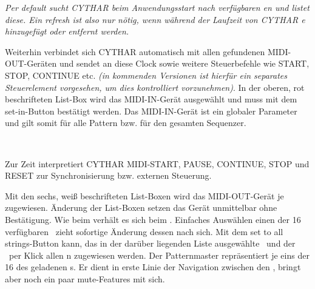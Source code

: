 \documentclass[10pt,final,a4paper]{report}
\begin{document}
\textit{Per default sucht CYTHAR beim Anwendungsstart nach verfügbaren \LEXmididevice en und listet diese. Ein refresh ist also nur nötig, wenn während der Laufzeit von CYTHAR \LEXmididevice e hinzugefügt oder entfernt werden.}

Weiterhin verbindet sich CYTHAR automatisch mit allen gefundenen MIDI-OUT-Geräten und sendet an diese Clock sowie weitere Steuerbefehle wie START, STOP, CONTINUE etc. \textit{(in kommenden Versionen ist hierfür ein separates Steuerelement vorgesehen, um dies kontrolliert vorzunehmen)}.
%
%
%
In der oberen, rot beschrifteten List-Box wird das MIDI-IN-Gerät ausgewählt und muss mit dem \gin set-in\gout-Button bestätigt werden. Das MIDI-IN-Gerät ist ein globaler Parameter und gilt somit für alle Pattern bzw. für den gesamten Sequenzer.

~

Zur Zeit interpretiert CYTHAR MIDI-START, PAUSE, CONTINUE, STOP und RESET zur Synchronisierung bzw. externen Steuerung.

%
%
%
Mit den sechs, weiß beschrifteten List-Boxen wird das MIDI-OUT-Gerät je  zugewiesen. Änderung der List-Boxen setzen das Gerät unmittelbar ohne Bestätigung.
%
%
%
Wie beim  verhält es sich beim \LEXmidichannel. Einfaches Auswählen einen der 16 verfügbaren \LEXmidichannels~zieht sofortige Änderung dessen nach sich.
%
%
%
Mit dem \gin set to all strings\gout-Button kann, das in der darüber liegenden Liste ausgewählte \LEXmididevice~und der \LEXmidichannel~per Klick allen n zugewiesen werden.
%
%
%
Der Patternmaster repräsentiert je eins der 16  des geladenen s. Er dient in erste Linie der Navigation zwischen den , bringt aber noch ein paar mute-Features mit sich.

~

\TITLEdragndrop
\end{document}
